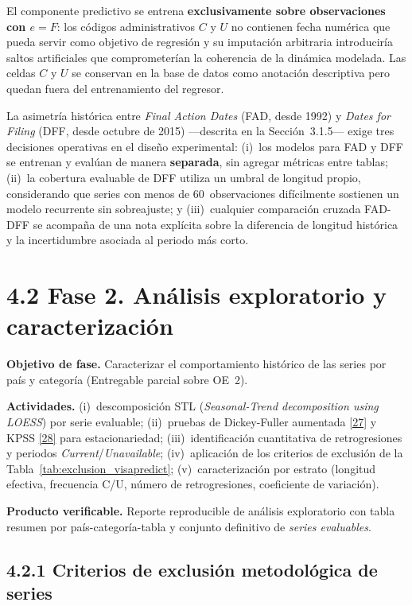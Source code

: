 \documentclass[12pt,letterpaper]{report}
\newcommand{\cita}[1]{\hyperref[bib:#1]{[#1]}}
\begin{document}
El componente predictivo se entrena \textbf{exclusivamente sobre observaciones con $e = F$}: los códigos administrativos $C$ y $U$ no contienen fecha numérica que pueda servir como objetivo de regresión y su imputación arbitraria introduciría saltos artificiales que comprometerían la coherencia de la dinámica modelada. Las celdas $C$ y $U$ se conservan en la base de datos como anotación descriptiva pero quedan fuera del entrenamiento del regresor.

La asimetría histórica entre \textit{Final Action Dates} (FAD, desde 1992) y \textit{Dates for Filing} (DFF, desde octubre de 2015) ---descrita en la Sección~3.1.5--- exige tres decisiones operativas en el diseño experimental: (i)~los modelos para FAD y DFF se entrenan y evalúan de manera \textbf{separada}, sin agregar métricas entre tablas; (ii)~la cobertura evaluable de DFF utiliza un umbral de longitud propio, considerando que series con menos de 60~observaciones difícilmente sostienen un modelo recurrente sin sobreajuste; y (iii)~cualquier comparación cruzada FAD-DFF se acompaña de una nota explícita sobre la diferencia de longitud histórica y la incertidumbre asociada al periodo más corto.

\section{4.2 Fase 2. Análisis exploratorio y caracterización}

\textbf{Objetivo de fase.} Caracterizar el comportamiento histórico de las series por país y categoría (Entregable parcial sobre OE~2).

\textbf{Actividades.} (i)~descomposición STL (\textit{Seasonal-Trend decomposition using LOESS}) por serie evaluable; (ii)~pruebas de Dickey-Fuller aumentada \cita{27} y KPSS \cita{28} para estacionariedad; (iii)~identificación cuantitativa de retrogresiones y periodos \textit{Current}/\textit{Unavailable}; (iv)~aplicación de los criterios de exclusión de la Tabla~\ref{tab:exclusion_visapredict}; (v)~caracterización por estrato (longitud efectiva, frecuencia C/U, número de retrogresiones, coeficiente de variación).

\textbf{Producto verificable.} Reporte reproducible de análisis exploratorio con tabla resumen por país-categoría-tabla y conjunto definitivo de \textit{series evaluables}.

\subsection*{4.2.1 Criterios de exclusión metodológica de series}
\end{document}
